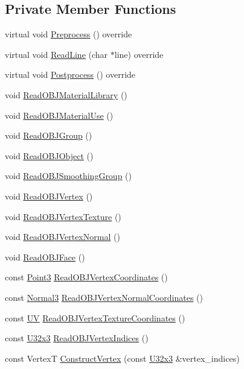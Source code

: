 \subsection*{Private Member Functions}
\begin{DoxyCompactItemize}
\item 
virtual void \hyperlink{classmage_1_1_o_b_j_reader_ae3a3ad3b50f1dd8dffe3109fc7dc2937}{Preprocess} () override
\item 
virtual void \hyperlink{classmage_1_1_o_b_j_reader_a8d4bd7be6de3098ba899cc36e3be1283}{Read\+Line} (char $\ast$line) override
\item 
virtual void \hyperlink{classmage_1_1_o_b_j_reader_a248977c8300575ed2bab04df26197919}{Postprocess} () override
\item 
void \hyperlink{classmage_1_1_o_b_j_reader_abc1f67436e50230bd2071b2dc31a4689}{Read\+O\+B\+J\+Material\+Library} ()
\item 
void \hyperlink{classmage_1_1_o_b_j_reader_aa4c73ff0e5e3de40cacbebc189037802}{Read\+O\+B\+J\+Material\+Use} ()
\item 
void \hyperlink{classmage_1_1_o_b_j_reader_a8159620b12d426073581202fee022662}{Read\+O\+B\+J\+Group} ()
\item 
void \hyperlink{classmage_1_1_o_b_j_reader_afc3f17024a006cce3b7869ca8c6a8f07}{Read\+O\+B\+J\+Object} ()
\item 
void \hyperlink{classmage_1_1_o_b_j_reader_a2dd830c506ffbfbcd932b9bf75a35c56}{Read\+O\+B\+J\+Smoothing\+Group} ()
\item 
void \hyperlink{classmage_1_1_o_b_j_reader_a70fc61d8cc14dc8efbd73a88188cc511}{Read\+O\+B\+J\+Vertex} ()
\item 
void \hyperlink{classmage_1_1_o_b_j_reader_ae0dfedd81f23e6e15725e9ef02dd3034}{Read\+O\+B\+J\+Vertex\+Texture} ()
\item 
void \hyperlink{classmage_1_1_o_b_j_reader_aa9ef2ced0ad787b13818722c7dfa0636}{Read\+O\+B\+J\+Vertex\+Normal} ()
\item 
void \hyperlink{classmage_1_1_o_b_j_reader_a647cd7683007f351096702924ce46a3b}{Read\+O\+B\+J\+Face} ()
\item 
const \hyperlink{structmage_1_1_point3}{Point3} \hyperlink{classmage_1_1_o_b_j_reader_ace593a436953e8583b5b4cd721893c44}{Read\+O\+B\+J\+Vertex\+Coordinates} ()
\item 
const \hyperlink{structmage_1_1_normal3}{Normal3} \hyperlink{classmage_1_1_o_b_j_reader_a2be022b43cf2ad848c7a2d013b16e5f2}{Read\+O\+B\+J\+Vertex\+Normal\+Coordinates} ()
\item 
const \hyperlink{structmage_1_1_u_v}{UV} \hyperlink{classmage_1_1_o_b_j_reader_a9b1a38d60a9d1c5c9095394fa37375e6}{Read\+O\+B\+J\+Vertex\+Texture\+Coordinates} ()
\item 
const \hyperlink{namespacemage_ab3633c193f686845fcf80ce95d18a20b}{U32x3} \hyperlink{classmage_1_1_o_b_j_reader_ae54af1156c89f3de4ff178b4f51f2081}{Read\+O\+B\+J\+Vertex\+Indices} ()
\item 
const VertexT \hyperlink{classmage_1_1_o_b_j_reader_af81b8f698b015c55a2f32c9f6fe5419d}{Construct\+Vertex} (const \hyperlink{namespacemage_ab3633c193f686845fcf80ce95d18a20b}{U32x3} \&vertex\+\_\+indices)
\end{DoxyCompactItemize}
